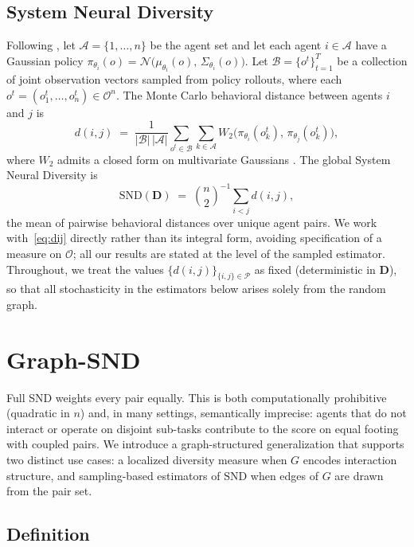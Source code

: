 \documentclass[11pt]{article}
\theoremstyle{plain}
\theoremstyle{definition}
\theoremstyle{remark}
\newcommand{\Agents}{\mathcal{A}}        %
\newcommand{\Normal}{\mathcal{N}}        %
\newcommand{\Obs}{\mathcal{O}}           %
\newcommand{\Rollouts}{\mathcal{B}}      %
\newcommand{\Pairs}{\mathcal{P}}         %
\newcommand{\policy}[1]{\pi_{\theta_{#1}}}
\newcommand{\Wass}{W_2}
\newcommand{\SND}{\ensuremath{\mathrm{SND}}}
\begin{document}
\subsection{System Neural Diversity}
Following \citet{bettini2025snd}, let $\Agents = \{1, \dots, n\}$ be the
agent set and let each agent $i \in \Agents$ have a Gaussian policy
$\policy{i}(o) = \Normal\bigl(\mu_{\theta_i}(o),\, \Sigma_{\theta_i}(o)\bigr)$.
Let $\Rollouts = \{o^t\}_{t=1}^T$ be a collection of joint observation
vectors sampled from policy rollouts, where each
$o^t = (o_1^t,\dots,o_n^t) \in \Obs^n$.
The Monte Carlo behavioral distance between agents $i$ and $j$ is
\begin{equation}
\label{eq:dij}
d(i,j) \;=\; \frac{1}{|\Rollouts|\,|\Agents|}
\sum_{o^t \in \Rollouts} \sum_{k \in \Agents}
\Wass\bigl(\policy{i}(o^t_k),\, \policy{j}(o^t_k)\bigr),
\end{equation}
where $\Wass$ admits a closed form on multivariate Gaussians
\citep{bettini2025snd}. The global System Neural Diversity is
\begin{equation}
\label{eq:snd}
\SND(\mathbf{D}) \;=\; \binom{n}{2}^{-1} \sum_{i<j} d(i,j),
\end{equation}
the mean of pairwise behavioral distances over unique agent pairs. We work
with~\eqref{eq:dij} directly rather than its integral form, avoiding
specification of a measure on $\Obs$; all our results are stated at the
level of the sampled estimator. Throughout, we treat the values
$\{d(i,j)\}_{\{i,j\} \in \Pairs}$ as fixed (deterministic in $\mathbf{D}$),
so that all stochasticity in the estimators below arises solely from the
random graph.

\section{Graph-SND}
\label{sec:method}

Full SND weights every pair equally. This is both computationally
prohibitive (quadratic in $n$) and, in many settings, semantically
imprecise: agents that do not interact or operate on disjoint sub-tasks
contribute to the score on equal footing with coupled pairs. We introduce a
graph-structured generalization that supports two distinct use cases: a
localized diversity measure when $G$ encodes interaction structure, and
sampling-based estimators of $\SND$ when edges of $G$ are drawn from the
pair set.

\subsection{Definition}
\end{document}
